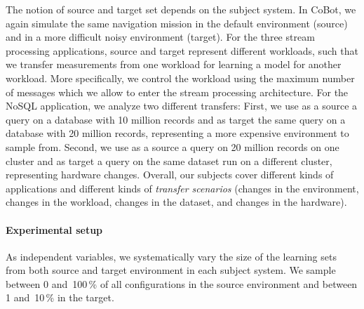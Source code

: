 The notion of source and target set depends on the subject system.
In CoBot, we again simulate the same navigation mission in the default environment (source) and
in a more difficult noisy environment (target).
For the three stream processing applications, source and target
represent different workloads, such that we transfer measurements
from one workload for learning a model for another workload. More specifically, we control the workload using the maximum number of messages which we allow to enter the stream processing architecture.
For the NoSQL application, we analyze two different transfers:
First, we use as a source a query on
a database with 10 million records and as target the same query
on a database with 20 million records, representing a more expensive environment to sample from. Second, we use as a source a query on 20 million records on one cluster and as target a query on the same
dataset run on a different cluster, representing hardware changes.
Overall, our subjects cover different kinds of applications and
different kinds of \emph{transfer scenarios} (changes in the environment,
changes in the workload, changes in the dataset, and changes
in the hardware).


\paragraph*{Experimental setup}
As independent variables, we systematically vary the size of the
learning sets from both source and target environment in each
subject system.
We sample between 0 and~100\,\% of all configurations in the source
environment and between 1 and~10\,\% in the
target.

